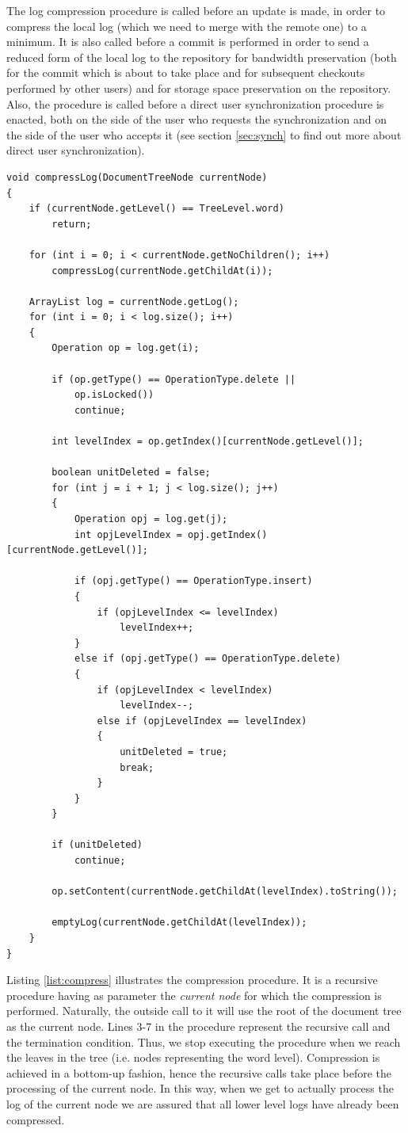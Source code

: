 The log compression procedure is called before an update is made, in order to compress the local log
(which we need to merge with the remote one) to a minimum. It is also called before a commit is performed
in order to send a reduced form of the local log to the repository for bandwidth preservation (both for
the commit which is about to take place and for subsequent checkouts performed by other users) and for
storage space preservation on the repository. Also,
the procedure is called before a direct user synchronization procedure is enacted, both on the side of the
user who requests the synchronization and on the side of the user who accepts it (see section \ref{sec:synch}
to find out more about direct user synchronization).

\begin{lstlisting}[frame=lines,float=p,caption=the compress procedure,label=list:compress]
void compressLog(DocumentTreeNode currentNode)
{
	if (currentNode.getLevel() == TreeLevel.word)
		return;

	for (int i = 0; i < currentNode.getNoChildren(); i++)
		compressLog(currentNode.getChildAt(i));

	ArrayList log = currentNode.getLog();
	for (int i = 0; i < log.size(); i++)
	{
		Operation op = log.get(i);

		if (op.getType() == OperationType.delete ||
			op.isLocked())
			continue;

		int levelIndex = op.getIndex()[currentNode.getLevel()];

		boolean unitDeleted = false;
		for (int j = i + 1; j < log.size(); j++)
		{
			Operation opj = log.get(j);
			int opjLevelIndex = opj.getIndex()[currentNode.getLevel()];

			if (opj.getType() == OperationType.insert)
			{
				if (opjLevelIndex <= levelIndex)
					levelIndex++;
			}
			else if (opj.getType() == OperationType.delete)
			{
				if (opjLevelIndex < levelIndex)
					levelIndex--;
				else if (opjLevelIndex == levelIndex)
				{
					unitDeleted = true;
					break;
				}
			}
		}

		if (unitDeleted)
			continue;

		op.setContent(currentNode.getChildAt(levelIndex).toString());

		emptyLog(currentNode.getChildAt(levelIndex));
	}
}
\end{lstlisting}

Listing \ref{list:compress} illustrates the compression procedure. It is a recursive procedure having as parameter the \emph{current node} for which the compression is performed. Naturally, the outside call
to it will use the root of the document tree as the current node. Lines 3-7 in the procedure represent
the recursive call and the termination condition. Thus, we stop executing the procedure when we reach
the leaves in the tree (i.e. nodes representing the word level). Compression is achieved in a bottom-up
fashion, hence the recursive calls take place before the processing of the current node. In this way,
when we get to actually process the log of the current node we are assured that all lower level logs
have already been compressed.

